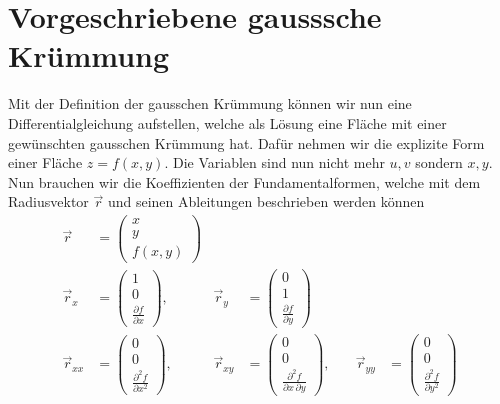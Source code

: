 %
%
%
%
\section{Vorgeschriebene gausssche Krümmung
\label{mongeampere:section:teil2}}
Mit der Definition der gausschen Krümmung können wir nun eine Differentialgleichung aufstellen,
welche als Lösung eine Fläche mit einer gewünschten gausschen Krümmung hat.
Dafür nehmen wir die explizite Form einer Fläche $z = f(x,y)$.
Die Variablen sind nun nicht mehr $u, v$ sondern $x, y$.
Nun brauchen wir die Koeffizienten der Fundamentalformen, welche mit dem Radiusvektor $\vec r$ und seinen Ableitungen 
beschrieben werden können
\begin{equation*}
\begin{aligned}
  \vec r &= \begin{pmatrix}
   x \\
   y \\
   f(x, y)
 \end{pmatrix} \\
    \vec r_x &= \begin{pmatrix}
      1 \\
      0 \\
      \frac{\partial f}{\partial x}
    \end{pmatrix},
      \quad &
    \vec r_y &= \begin{pmatrix}
      0 \\
      1 \\
      \frac{\partial f}{\partial y}
    \end{pmatrix}\\
      \vec r_{xx} &= \begin{pmatrix}
      0 \\
      0 \\
      \frac{\partial^2 f}{\partial x^2}
    \end{pmatrix},
    \quad &
    \vec r_{xy} &= \begin{pmatrix}
      0 \\
      0 \\
      \frac{\partial^2 f}{\partial x \, \partial y}
    \end{pmatrix},
      \quad &
    \vec r_{yy} &= \begin{pmatrix}
      0 \\
      0 \\
      \frac{\partial^2 f}{\partial y^2}
    \end{pmatrix}
\end{aligned}
\end{equation*}
